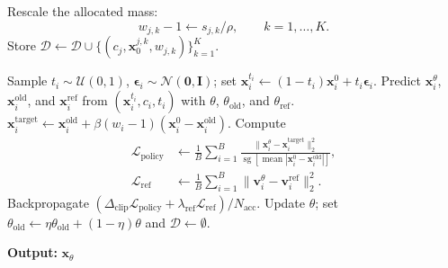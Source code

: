 \begin{algorithm}[H]
\begin{algorithmic}[1]
                \State Rescale the allocated mass:
                \[
                    w_{j,k}-1\leftarrow s_{j,k}/\rho,
                    \qquad k=1,\dots,K.
                \]
                \State Store
                $\mathcal{D}\leftarrow\mathcal{D}\cup
                \{(c_j,\mathbf{x}_0^{j,k},w_{j,k})\}_{k=1}^{K}$.
            \EndFor

                \State Sample $t_i\sim\mathcal{U}(0,1)$,
                $\boldsymbol{\epsilon}_i\sim\mathcal{N}(\mathbf{0},\mathbf{I})$;
                set $\mathbf{x}_i^{t_i}\leftarrow
                (1-t_i)\mathbf{x}_i^0+t_i\boldsymbol{\epsilon}_i$.
                \State Predict $\mathbf{x}_i^\theta$,
                $\mathbf{x}_i^{\mathrm{old}}$, and $\mathbf{x}_i^{\mathrm{ref}}$
                from $(\mathbf{x}_i^{t_i},c_i,t_i)$ with
                $\theta$, $\theta_{\mathrm{old}}$, and $\theta_{\mathrm{ref}}$.
                \State $\mathbf{x}_i^{\mathrm{target}}\leftarrow
                \mathbf{x}_i^{\mathrm{old}}+
                \beta(w_i-1)(\mathbf{x}_i^0-\mathbf{x}_i^{\mathrm{old}})$.
                \State Compute
                \[
                    \begin{aligned}
                    \mathcal{L}_{\mathrm{policy}}
                    &\leftarrow\frac{1}{B}\sum_{i=1}^{B}
                    \frac{\|\mathbf{x}_i^\theta-\mathbf{x}_i^{\mathrm{target}}\|_2^2}
                    {\operatorname{sg}[\operatorname{mean}
                    |\mathbf{x}_i^0-\mathbf{x}_i^{\mathrm{old}}|]},\\
                    \mathcal{L}_{\mathrm{ref}}
                    &\leftarrow\frac{1}{B}\sum_{i=1}^{B}
                    \|\mathbf{v}_i^\theta-\mathbf{v}_i^{\mathrm{ref}}\|_2^2.
                    \end{aligned}
                \]
                \State Backpropagate
                $(\Delta_{\mathrm{clip}}\mathcal{L}_{\mathrm{policy}}+
                \lambda_{\mathrm{ref}}\mathcal{L}_{\mathrm{ref}})/N_{\mathrm{acc}}$.
            \EndFor
            \State Update $\theta$; set
            $\theta_{\mathrm{old}}\leftarrow
            \eta\theta_{\mathrm{old}}+(1-\eta)\theta$ and
            $\mathcal{D}\leftarrow\emptyset$.
        \EndFor
    \end{algorithmic}
    \textbf{Output:} $\mathbf{x}_\theta$
\end{algorithm}


